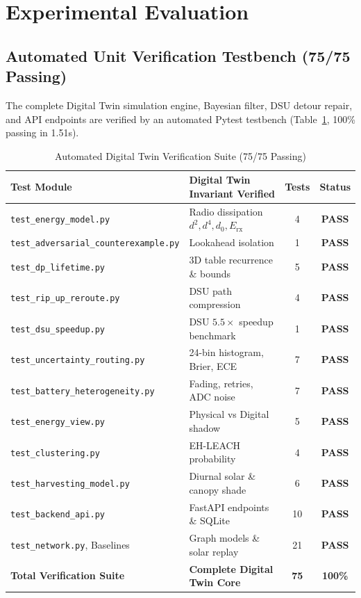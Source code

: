 \documentclass[journal]{IEEEtran}
\begin{document}
\section{Experimental Evaluation}

\subsection{Automated Unit Verification Testbench (75/75 Passing)}
The complete Digital Twin simulation engine, Bayesian filter, DSU detour repair, and API endpoints are verified by an automated Pytest testbench (Table~\ref{tab:dt_tests}, 100\% passing in 1.51s).

\begin{table}[!t]
\caption{Automated Digital Twin Verification Suite (75/75 Passing)}
\label{tab:dt_tests}
\centering
\begin{tabular}{@{}llcc@{}}
\toprule
\textbf{Test Module} & \textbf{Digital Twin Invariant Verified} & \textbf{Tests} & \textbf{Status} \\
\midrule
\texttt{test\_energy\_model.py} & Radio dissipation $d^2, d^4, d_0, E_{\text{rx}}$ & 4 & \textbf{PASS} \\
\texttt{test\_adversarial\_counterexample.py} & Lookahead isolation & 1 & \textbf{PASS} \\
\texttt{test\_dp\_lifetime.py} & 3D table recurrence \& bounds & 5 & \textbf{PASS} \\
\texttt{test\_rip\_up\_reroute.py} & DSU path compression & 4 & \textbf{PASS} \\
\texttt{test\_dsu\_speedup.py} & DSU $5.5\times$ speedup benchmark & 1 & \textbf{PASS} \\
\texttt{test\_uncertainty\_routing.py} & 24-bin histogram, Brier, ECE & 7 & \textbf{PASS} \\
\texttt{test\_battery\_heterogeneity.py} & Fading, retries, ADC noise & 7 & \textbf{PASS} \\
\texttt{test\_energy\_view.py} & Physical vs Digital shadow & 5 & \textbf{PASS} \\
\texttt{test\_clustering.py} & EH-LEACH probability & 4 & \textbf{PASS} \\
\texttt{test\_harvesting\_model.py} & Diurnal solar \& canopy shade & 6 & \textbf{PASS} \\
\texttt{test\_backend\_api.py} & FastAPI endpoints \& SQLite & 10 & \textbf{PASS} \\
\texttt{test\_network.py}, Baselines & Graph models \& solar replay & 21 & \textbf{PASS} \\
\midrule
\textbf{Total Verification Suite} & \textbf{Complete Digital Twin Core} & \textbf{75} & \textbf{100\%} \\
\bottomrule
\end{tabular}
\end{table}
\end{document}
